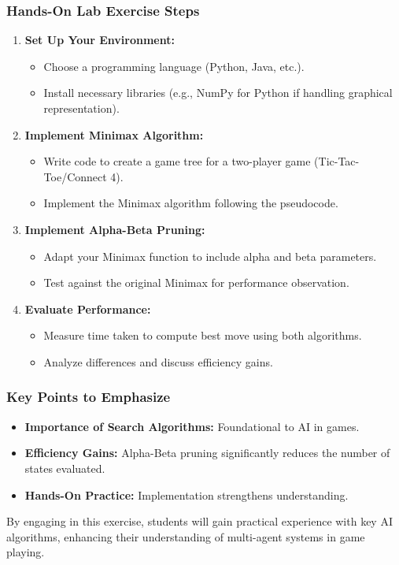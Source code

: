 \documentclass[aspectratio=169]{beamer}
\begin{document}
\begin{frame}
    \frametitle{Hands-On Lab Exercise Steps}
    \begin{enumerate}
        \item \textbf{Set Up Your Environment:} 
        \begin{itemize}
            \item Choose a programming language (Python, Java, etc.).
            \item Install necessary libraries (e.g., NumPy for Python if handling graphical representation).
        \end{itemize}
        
        \item \textbf{Implement Minimax Algorithm:} 
        \begin{itemize}
            \item Write code to create a game tree for a two-player game (Tic-Tac-Toe/Connect 4).
            \item Implement the Minimax algorithm following the pseudocode.
        \end{itemize}
        
        \item \textbf{Implement Alpha-Beta Pruning:} 
        \begin{itemize}
            \item Adapt your Minimax function to include alpha and beta parameters.
            \item Test against the original Minimax for performance observation.
        \end{itemize}

        \item \textbf{Evaluate Performance:} 
        \begin{itemize}
            \item Measure time taken to compute best move using both algorithms.
            \item Analyze differences and discuss efficiency gains.
        \end{itemize}
    \end{enumerate}
\end{frame}

\begin{frame}
    \frametitle{Key Points to Emphasize}
    \begin{itemize}
        \item \textbf{Importance of Search Algorithms:} Foundational to AI in games.
        \item \textbf{Efficiency Gains:} Alpha-Beta pruning significantly reduces the number of states evaluated.
        \item \textbf{Hands-On Practice:} Implementation strengthens understanding.
    \end{itemize}
    
    By engaging in this exercise, students will gain practical experience with key AI algorithms, enhancing their understanding of multi-agent systems in game playing.
\end{frame}
\end{document}
